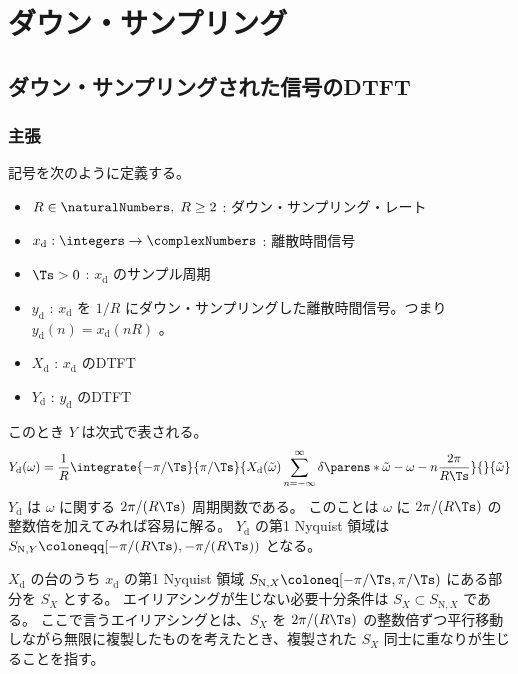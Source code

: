 \chapter{ダウン・サンプリング}
    \section{ダウン・サンプリングされた信号のDTFT}
        \newcommand{\xd}{x_\text{d}}
        \newcommand{\yd}{y_\text{d}}
        \newcommand{\Xd}{X_\text{d}}
        \newcommand{\Yd}{Y_\text{d}}
        \subsection{主張}
            記号を次のように定義する。
            \begin{itemize}
                \item $R\in\naturalNumbers,\;R\geq 2$ : ダウン・サンプリング・レート
                \item $\xd:\integers\to\complexNumbers$ : 離散時間信号
                \item $\Ts>0$ : $\xd$ のサンプル周期
                \item $\yd$ : $\xd$ を $1/R$ にダウン・サンプリングした離散時間信号。つまり $\yd(n) = \xd(nR)$ 。
                \item $\Xd$ : $\xd$ のDTFT
                \item $\Yd$ : $\yd$ のDTFT
            \end{itemize}
            このとき $Y$ は次式で表される。
            \[ \Yd(\omega) = \frac{1}{R}\integrate{-\pi/\Ts}{\pi/\Ts}{\Xd(\tilde{\omega})\sum_{n=-\infty}^\infty\delta\parens*{\tilde{\omega}-\omega-n\frac{2\pi}{R\Ts}}}{}{\tilde{\omega}} \]
            $\Yd$ は $\omega$ に関する $2\pi/(R\Ts)$ 周期関数である。
            このことは $\omega$ に $2\pi/(R\Ts)$ の整数倍を加えてみれば容易に解る。
            $\Yd$ の第1 Nyquist 領域は $S_{\text{N},Y} \coloneqq [-\pi/(R\Ts),-\pi/(R\Ts))$ となる。
            \par
            $\Xd$ の台のうち $\xd$ の第1 Nyquist 領域 $S_{\text{N},X} \coloneq [-\pi/\Ts, \pi/\Ts)$ にある部分を $S_X$ とする。
            エイリアシングが生じない必要十分条件は $S_X\subset S_{\text{N},X}$ である。
            ここで言うエイリアシングとは、$S_X$ を $2\pi/(R\Ts)$ の整数倍ずつ平行移動しながら無限に複製したものを考えたとき、複製された $S_X$ 同士に重なりが生じることを指す。
